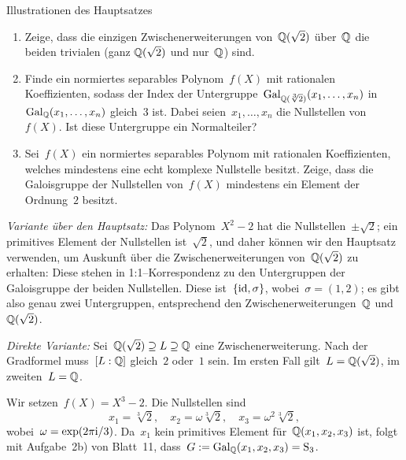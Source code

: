 \documentclass{algblatt}
\begin{document}
\vspace*{-1.5cm}

\begin{aufgabe}{Illustrationen des Hauptsatzes}
\begin{enumerate}
\item Zeige, dass die einzigen Zwischenerweiterungen von~$\mathbb{Q}(\sqrt{2})$
über~$\mathbb{Q}$ die beiden trivialen (ganz $\mathbb{Q}(\sqrt{2})$ und nur~$\mathbb{Q}$) sind.
\item Finde ein normiertes separables Polynom~$f(X)$ mit rationalen Koeffizienten,
sodass der Index der Untergruppe~$\mathrm{Gal}_{\mathbb{Q}(\sqrt[3]{2})}(x_1,\ldots,x_n)$
in~$\mathrm{Gal}_{\mathbb{Q}}(x_1,\ldots,x_n)$ gleich~$3$ ist. Dabei seien~$x_1,\ldots,x_n$ die
Nullstellen von~$f(X)$. Ist diese Untergruppe ein Normalteiler?
\item Sei~$f(X)$ ein normiertes separables Polynom mit rationalen
Koeffizienten, welches mindestens eine echt komplexe Nullstelle besitzt.
Zeige, dass die Galoisgruppe der Nullstellen von~$f(X)$ mindestens ein Element
der Ordnung~$2$ besitzt.
\end{enumerate}

\begin{loesungE}
\item
\emph{Variante über den Hauptsatz:} Das Polynom~$X^2 - 2$ hat die
Nullstellen~$\pm\sqrt{2}$; ein primitives Element der Nullstellen
ist~$\sqrt{2}$, und daher können wir den Hauptsatz verwenden, um Auskunft über
die Zwischenerweiterungen von~$\mathbb{Q}(\sqrt{2})$ zu erhalten: Diese stehen in
1:1--Korrespondenz zu den Untergruppen der Galoisgruppe der beiden Nullstellen.
Diese ist~$\{ \mathrm{id}, \sigma \}$, wobei~$\sigma = (1, 2)$; es gibt also genau zwei
Untergruppen, entsprechend den Zwischenerweiterungen~$\mathbb{Q}$ und~$\mathbb{Q}(\sqrt{2})$.

\emph{Direkte Variante:} Sei~$\mathbb{Q}(\sqrt{2}) \supseteq L \supseteq \mathbb{Q}$ eine
Zwischenerweiterung. Nach der Gradformel muss~$[L:\mathbb{Q}]$ gleich~$2$ oder~$1$
sein. Im ersten Fall gilt~$L = \mathbb{Q}(\sqrt{2})$, im zweiten~$L = \mathbb{Q}$.

\item Wir setzen~$f(X) = X^3 - 2$. Die Nullstellen sind
\[ x_1 = \sqrt[3]{2},\quad
  x_2 = \omega \sqrt[3]{2},\quad
  x_3 = \omega^2 \sqrt[3]{2}, \]
wobei~$\omega = \exp(2\pi\mathrm{i}/3)$. Da~$x_1$ kein primitives Element
für~$\mathbb{Q}(x_1,x_2,x_3)$ ist, folgt mit Aufgabe~2b) von Blatt~11,
dass~$G := \mathrm{Gal}_{\mathbb{Q}}(x_1,x_2,x_3) = \mathrm{S}_3$.


\end{loesungE}
\end{aufgabe}
\end{document}
